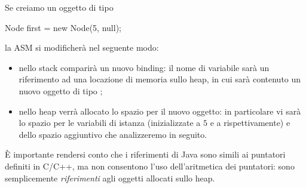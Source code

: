 Se creiamo un oggetto di tipo 
\begin{Java}
    Node first = new Node(5, null);
\end{Java} la ASM si modificherà nel seguente modo:
\begin{itemize}
    \item nello stack comparirà un nuovo binding: il nome di variabile  sarà un riferimento ad una locazione di memoria sullo heap, in cui sarà contenuto un nuovo oggetto di tipo ;
    \item nello heap verrà allocato lo spazio per il nuovo oggetto: in particolare vi sarà lo spazio per le variabili di istanza (inizializzate a $5$ e a  rispettivamente) e dello spazio aggiuntivo che analizzeremo in seguito.
\end{itemize}

È importante rendersi conto che i riferimenti di Java sono simili ai puntatori definiti in C/C++, ma non consentono l'uso dell'aritmetica dei puntatori: sono semplicemente \emph{riferimenti} agli oggetti allocati sullo heap.